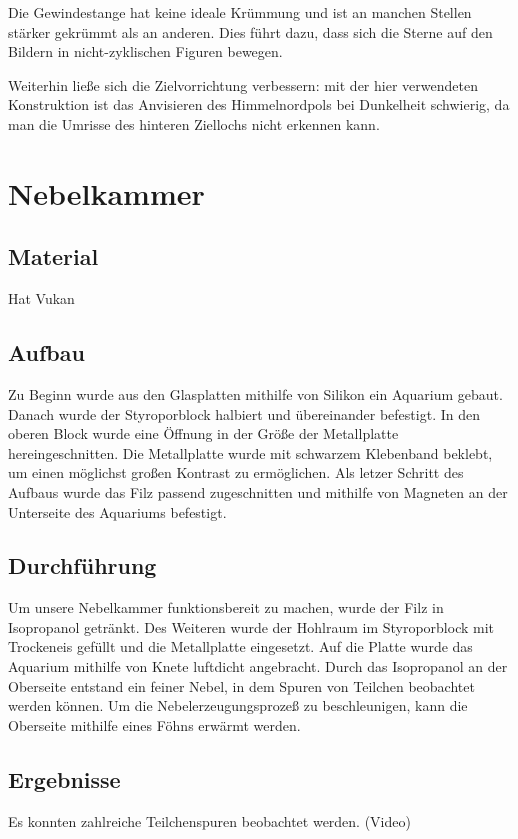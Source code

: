 \documentclass[
  bibliography=totoc,     %
  captions=tableheading,  %
  titlepage=firstiscover, %
  twocolumn,
]{scrartcl}
\begin{document}
Die Gewindestange hat keine ideale Krümmung und ist an manchen Stellen stärker
gekrümmt als an anderen. Dies führt dazu, dass sich die Sterne auf den Bildern
in nicht-zyklischen Figuren bewegen. 

Weiterhin ließe sich die Zielvorrichtung verbessern: mit der hier verwendeten Konstruktion ist das Anvisieren des Himmelnordpols bei Dunkelheit schwierig, da man die Umrisse des hinteren Ziellochs nicht erkennen kann.

\section{Nebelkammer}

\subsection{Material}
Hat Vukan


\subsection{Aufbau}
Zu Beginn wurde aus den Glasplatten mithilfe von Silikon ein Aquarium gebaut.
Danach wurde der Styroporblock halbiert und übereinander befestigt. In den
oberen Block wurde eine Öffnung in der Größe der Metallplatte hereingeschnitten.
Die Metallplatte wurde mit schwarzem Klebenband beklebt, um einen möglichst
großen Kontrast zu ermöglichen. Als letzer Schritt des Aufbaus wurde das Filz
passend zugeschnitten und mithilfe von Magneten an der Unterseite des Aquariums
befestigt.

\subsection{Durchführung}
Um unsere Nebelkammer funktionsbereit zu machen, wurde der Filz in Isopropanol
getränkt. Des Weiteren wurde der Hohlraum im Styroporblock mit Trockeneis
gefüllt und die Metallplatte eingesetzt. Auf die Platte wurde das Aquarium
mithilfe von Knete luftdicht angebracht. Durch das Isopropanol an der Oberseite
entstand ein feiner Nebel, in dem Spuren von Teilchen beobachtet werden können.
Um die Nebelerzeugungsprozeß zu beschleunigen, kann die Oberseite mithilfe eines
Föhns erwärmt werden.

\subsection{Ergebnisse}
Es konnten zahlreiche Teilchenspuren beobachtet werden. (Video)
\end{document}
